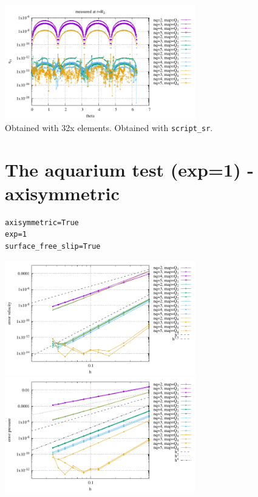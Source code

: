\begin{center}
\includegraphics[width=8.3cm]{python_codes/fieldstone_152/results/exp1/err_R2}\\
{\captionfont Obtained with 32x elements. Obtained with {\tt script\_sr}.}
\end{center}


\newpage
\section*{The aquarium test (exp=1) - axisymmetric}

\begin{lstlisting}
axisymmetric=True
exp=1
surface_free_slip=True
\end{lstlisting}



\begin{center}
\includegraphics[width=8.3cm]{python_codes/fieldstone_152/results/exp1_axisymmetric/errv}
\includegraphics[width=8.3cm]{python_codes/fieldstone_152/results/exp1_axisymmetric/errp}
\end{center}


